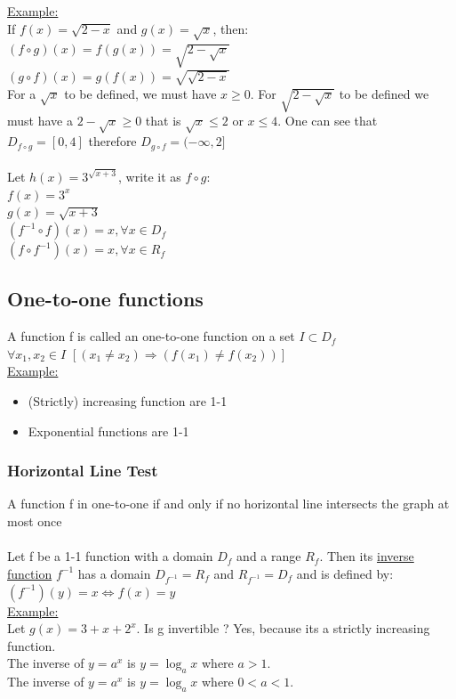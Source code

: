 \documentclass{article}
\begin{document}
	\underline{Example:} \\
	If $f(x) = \sqrt{2-x}$ and $g(x) = \sqrt{x}$, then: \\
	$(f \circ g)(x) = f(g(x)) = \sqrt{2-\sqrt{x}}$ \\
	$(g \circ f)(x) = g(f(x)) = \sqrt{\sqrt{2-x}}$  \\
	For a $\sqrt{x}$ to be defined, we must have $x\geq 0$. For $\sqrt{2-\sqrt{x}}$ to be defined we must have a $2-\sqrt{x} \geq 0$ that is $\sqrt{x} \leq 2$ or $x\leq 4$. One can see that $D_{f\circ g} = [0, 4]$ therefore $D_{g\circ f} = (-\infty, 2]$ \\ \\
	Let $h(x) = 3^{\sqrt{x+3}}$, write it as $f \circ g$: \\
	$f(x) = 3^x$ \\ $g(x) = \sqrt{x+3}$ \\
	$(f^{-1} \circ f)(x) = x, \forall x\in D_f$ \\
	$(f \circ f^{-1})(x) = x, \forall x\in R_f$
	\subsection{One-to-one functions}
	A function f is called an one-to-one function on a set $I \subset D_f$ \\
	$\forall x_1, x_2 \in I$ $[(x_1 \neq x_2) \Rightarrow (f(x_1) \neq f(x_2))]$ \\
	\underline{Example:}
	\begin{itemize}
		\item (Strictly) increasing function are 1-1
		\item Exponential functions are 1-1
	\end{itemize}
	\subsubsection{Horizontal Line Test}
	A function f in one-to-one if and only if no horizontal line intersects the graph at most once \\ \\
	
	Let f be a 1-1 function with a domain $D_f$ and a range $R_f$. Then its \underline{inverse function} $f^{-1}$ has a domain $D_{f^{-1}} = R_f$ and $R_{f^{-1}} = D_f$ and is defined by: \\
	$(f^{-1})(y) = x \Leftrightarrow f(x) = y$ \\
	\underline{Example:}\\
	Let $g(x) = 3+x+2^x$. Is g invertible ? Yes, because its a strictly increasing function.\\
	The inverse of $y=a^x$ is $y=\log_ax$ where $a>1$. \\
	The inverse of $y=a^x$ is $y=\log_ax$ where $0<a< 1$.\\ 
	\pagebreak
\end{document}
